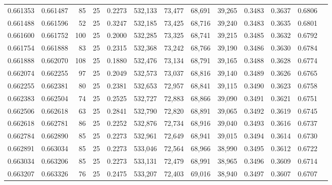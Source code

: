 \begin{tabular}{rrrrrrrrrrrrr}
0.661353 & 0.661487 &    85 &  25 &                                     0.2273 & 532,133 &  73,477 &  68,691 &  39,265 & 0.3483 & 0.3637 & 0.6806 \\
0.661488 & 0.661596 &    52 &  25 &                                     0.3247 & 532,185 &  73,425 &  68,716 &  39,240 & 0.3483 & 0.3635 & 0.6801 \\
0.661600 & 0.661752 &   100 &  25 &                                     0.2000 & 532,285 &  73,325 &  68,741 &  39,215 & 0.3485 & 0.3632 & 0.6792 \\
0.661754 & 0.661888 &    83 &  25 &                                     0.2315 & 532,368 &  73,242 &  68,766 &  39,190 & 0.3486 & 0.3630 & 0.6784 \\
0.661888 & 0.662070 &   108 &  25 &                                     0.1880 & 532,476 &  73,134 &  68,791 &  39,165 & 0.3488 & 0.3628 & 0.6774 \\
0.662074 & 0.662255 &    97 &  25 &                                     0.2049 & 532,573 &  73,037 &  68,816 &  39,140 & 0.3489 & 0.3626 & 0.6765 \\
0.662255 & 0.662381 &    80 &  25 &                                     0.2381 & 532,653 &  72,957 &  68,841 &  39,115 & 0.3490 & 0.3623 & 0.6758 \\
0.662383 & 0.662504 &    74 &  25 &                                     0.2525 & 532,727 &  72,883 &  68,866 &  39,090 & 0.3491 & 0.3621 & 0.6751 \\
0.662506 & 0.662618 &    63 &  25 &                                     0.2841 & 532,790 &  72,820 &  68,891 &  39,065 & 0.3492 & 0.3619 & 0.6745 \\
0.662618 & 0.662781 &    86 &  25 &                                     0.2252 & 532,876 &  72,734 &  68,916 &  39,040 & 0.3493 & 0.3616 & 0.6737 \\
0.662784 & 0.662890 &    85 &  25 &                                     0.2273 & 532,961 &  72,649 &  68,941 &  39,015 & 0.3494 & 0.3614 & 0.6730 \\
0.662891 & 0.663034 &    85 &  25 &                                     0.2273 & 533,046 &  72,564 &  68,966 &  38,990 & 0.3495 & 0.3612 & 0.6722 \\
0.663034 & 0.663206 &    85 &  25 &                                     0.2273 & 533,131 &  72,479 &  68,991 &  38,965 & 0.3496 & 0.3609 & 0.6714 \\
0.663207 & 0.663326 &    76 &  25 &                                     0.2475 & 533,207 &  72,403 &  69,016 &  38,940 & 0.3497 & 0.3607 & 0.6707 \\

\end{tabular}
